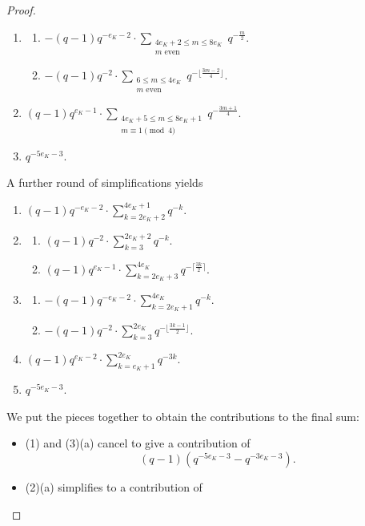 \documentclass[11pt]{amsart}
\theoremstyle{theorem}
\theoremstyle{example}
\theoremstyle{definition}
\numberwithin{theorem}{section}
\numberwithin{theorem}{section}
\begin{document}
\begin{proof}
\begin{enumerate}
\begin{enumerate}
        \end{enumerate}
        \item \begin{enumerate}
            \item $-(q-1)q^{-e_K-2}\cdot\sum_{\substack{4e_K + 2 \leq m \leq 8e_K \\ \text{$m$ even}}} q^{-\frac{m}{2}}$.
            \item $-(q-1)q^{-2}\cdot\sum_{\substack{6 \leq m \leq 4e_K \\ \text{$m$ even}}} q^{-\lfloor\frac{3m-2}{4}\rfloor}$. 
        \end{enumerate}
        \item $(q-1)q^{e_K - 1}\cdot \sum_{\substack{4e_K + 5 \leq m \leq 8e_K + 1 \\ m\equiv 1\pmod{4}}} q^{-\frac{3m + 1}{4}}$.
        \item $q^{-5e_K - 3}$.
    \end{enumerate}
    A further round of simplifications yields 
    \begin{enumerate}
        \item $(q-1)q^{-e_K - 2}\cdot \sum_{k=2e_K + 2}^{4e_K+1}q^{-k}$.
        \item \begin{enumerate}
            \item $(q-1)q^{-2}\cdot\sum_{k=3}^{2e_K+2}q^{-k}$.
            \item $(q-1)q^{e_K - 1}\cdot\sum_{k=2e_K + 3}^{4e_K}q^{-\lceil\frac{3k}{2}\rceil}$.
        \end{enumerate}
        \item \begin{enumerate}
            \item $-(q-1)q^{-e_K-2}\cdot\sum_{k=2e_K+1}^{4e_K}q^{-k}$.
            \item $-(q-1)q^{-2}\cdot\sum_{k=3}^{2e_K}q^{-\lfloor \frac{3k-1}{2}\rfloor}$.
        \end{enumerate}
        \item $(q-1)q^{e_K-2}\cdot \sum_{k=e_K + 1}^{2e_K}q^{-3k}$.
        \item $q^{-5e_K - 3}$.
    \end{enumerate}
    We put the pieces together to obtain the contributions to the final sum:
    \begin{itemize}
        \item (1) and (3)(a) cancel to give a contribution of
        $$
        (q-1)(q^{-5e_K - 3} - q^{-3e_K - 3}).
        $$
        \item (2)(a) simplifies to a contribution of  

\end{itemize}
\end{proof}
\end{document}
